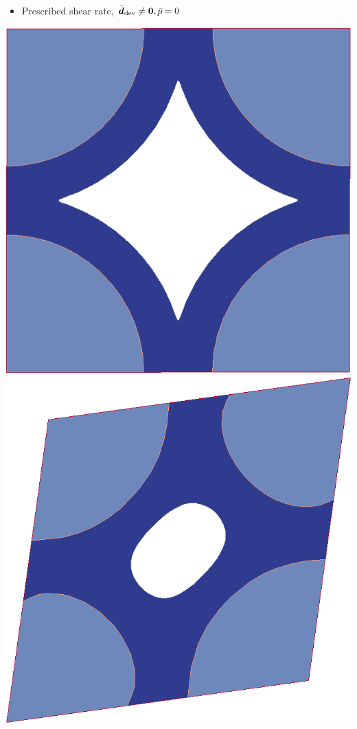 \documentclass[11pt]{beamer} %
\begin{document}
\begin{frame}
\begin{itemize}
  \item Prescribed shear rate, $\bar{\boldsymbol{d}}_{\mathrm{dev}} \neq \boldsymbol{0}, \bar{p} = 0$
 \end{itemize}
 \begin{center}
  \includegraphics[scale=0.10]{figures/evolve_shear_a}\quad
  \includegraphics[scale=0.10]{figures/evolve_shear_b}\;

\end{center}
\end{frame}
\end{document}
